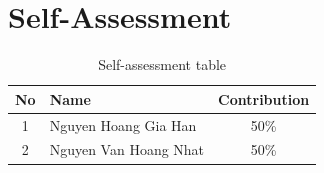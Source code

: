 \section*{Self-Assessment}
\setlength{\tabcolsep}{12pt} %
\renewcommand{\arraystretch}{1.6} %

\begin{table}[H]
\centering
\begin{tabular}{|c|l|c|}
\hline
\textbf{No} & \textbf{Name} & \textbf{Contribution} \\ \hline
1           &  Nguyen Hoang Gia Han          & 50\%                     \\ \hline
2           & Nguyen Van Hoang Nhat          & 50\%                  \\ \hline
\end{tabular}
\caption{Self-assessment table}
\end{table}
